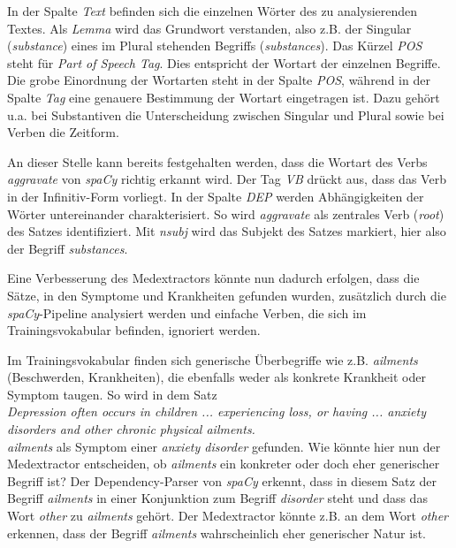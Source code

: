 In der Spalte \emph{Text} befinden sich die einzelnen Wörter des zu analysierenden Textes. Als \emph{Lemma} wird das Grundwort verstanden, also z.B. der Singular (\emph{substance}) eines im Plural stehenden Begriffs (\emph{substances}). 
Das Kürzel \emph{POS} steht für \emph{Part of Speech Tag}. Dies entspricht der Wortart der einzelnen Begriffe. Die grobe Einordnung der Wortarten steht in der Spalte \emph{POS}, während in der Spalte \emph{Tag} eine genauere Bestimmung der Wortart eingetragen ist. Dazu gehört u.a. bei Substantiven die Unterscheidung zwischen Singular und Plural sowie bei Verben die Zeitform.

An dieser Stelle kann bereits festgehalten werden, dass die Wortart des Verbs \emph{aggravate} von \emph{spaCy} richtig erkannt wird. Der Tag \emph{VB} drückt aus, dass das Verb in der Infinitiv-Form vorliegt. In der Spalte \emph{DEP} werden Abhängigkeiten der Wörter untereinander charakterisiert. So wird \emph{aggravate} als zentrales Verb (\emph{root}) des Satzes identifiziert. Mit \emph{nsubj} wird das Subjekt des Satzes markiert, hier also der Begriff \emph{substances}.

Eine Verbesserung des Medextractors könnte nun dadurch erfolgen, dass die Sätze, in den Symptome und Krankheiten gefunden wurden, zusätzlich durch die \emph{spaCy}-Pipeline analysiert werden und einfache Verben, die sich im Trainingsvokabular befinden, ignoriert werden.

Im Trainingsvokabular finden sich generische Überbegriffe wie z.B. \emph{ailments} (Beschwerden, Krankheiten), die ebenfalls weder als konkrete Krankheit oder Symptom taugen. So wird in dem Satz\\

\emph{\glqq Depression often occurs in children ... experiencing loss, or having ... anxiety disorders and other chronic physical ailments.\grqq}\\

\emph{ailments} als Symptom einer \emph{anxiety disorder} gefunden. Wie könnte hier nun der Medextractor entscheiden, ob \emph{ailments} ein konkreter oder doch eher generischer Begriff ist? Der Dependency-Parser von \emph{spaCy} erkennt, dass in diesem Satz der Begriff \emph{ailments} in einer Konjunktion zum Begriff \emph{disorder} steht und dass das Wort \emph{other} zu \emph{ailments} gehört. Der Medextractor könnte z.B. an dem Wort \emph{other} erkennen, dass der Begriff \emph{ailments} wahrscheinlich eher generischer Natur ist.

